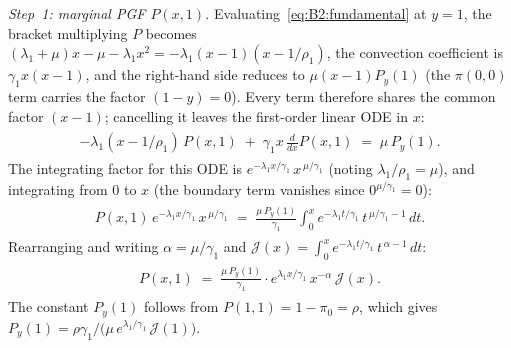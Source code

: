 \medskip\noindent\textit{Step~1: marginal PGF $P(x,1)$.}\enspace
Evaluating~\eqref{eq:B2:fundamental} at $y=1$, the bracket multiplying $P$ becomes
$(\lambda_1+\mu)x-\mu-\lambda_1 x^2=-\lambda_1(x-1)(x-1/\rho_1)$, the convection
coefficient is $\gamma_1 x(x-1)$, and the right-hand side reduces to $\mu(x-1)P_y(1)$
(the $\pi(0,0)$ term carries the factor $(1-y)=0$). Every term therefore shares the common
factor $(x-1)$; cancelling it leaves the first-order linear ODE in $x$:
\begin{align}
    \begin{split}
        -\lambda_1(x-1/\rho_1)\,P(x,1)
        \;+\; \gamma_1 x\,\frac{d}{dx}P(x,1)
        \;=\; \mu\,P_y(1).
    \end{split}
    \label{eq:B2:ode_y1}
\end{align}
The integrating factor for this ODE is $e^{-\lambda_1 x/\gamma_1}\,x^{\,\mu/\gamma_1}$
(noting $\lambda_1/\rho_1=\mu$), and integrating from $0$ to $x$ (the boundary term
vanishes since $0^{\mu/\gamma_1}=0$):
\begin{align}
    \begin{split}
        P(x,1)\,e^{-\lambda_1 x/\gamma_1}\,x^{\,\mu/\gamma_1}
        \;=\; \frac{\mu\,P_y(1)}{\gamma_1}
        \int_0^x e^{-\lambda_1 t/\gamma_1}\,t^{\,\mu/\gamma_1-1}\,dt.
    \end{split}
\end{align}
Rearranging and writing $\alpha=\mu/\gamma_1$ and
$\mathcal{J}(x)=\int_0^x e^{-\lambda_1 t/\gamma_1}\,t^{\,\alpha-1}\,dt$:
\begin{align}
    \begin{split}
        P(x,1)
        \;=\; \frac{\mu\,P_y(1)}{\gamma_1}
        \cdot e^{\lambda_1 x/\gamma_1}\,x^{-\alpha}\,\mathcal{J}(x).
    \end{split}
    \label{eq:B2:Px1}
\end{align}
The constant $P_y(1)$ follows from $P(1,1)=1-\pi_0=\rho$, which gives
$P_y(1)=\rho\gamma_1/\bigl(\mu\,e^{\lambda_1/\gamma_1}\,\mathcal{J}(1)\bigr)$.

